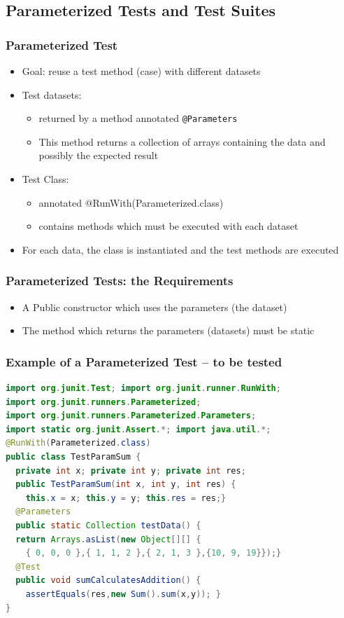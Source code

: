 \documentclass{beamer}
\begin{document}
\subsection{Parameterized Tests and Test Suites}
\begin{frame}
\frametitle{Parameterized Test}
\begin{itemize}
  \item Goal: reuse a test method (case) with different datasets
  \item Test datasets:
\begin{itemize}
\item returned by a method annotated \texttt{@Parameters}
\item This method returns a collection of arrays containing the data
  and possibly the expected result
\end{itemize}
  \item Test Class:
\begin{itemize}
  \item annotated @RunWith(Parameterized.class)
  \item contains methods which must be executed with each dataset
\end{itemize}
\item For each data, the class is instantiated and the test methods
  are executed
\end{itemize}
\end{frame}
\begin{frame}
\frametitle{Parameterized Tests: the Requirements}
\begin{itemize}
\item A Public constructor which uses the parameters (the dataset)
  
  \item The method which returns the parameters (datasets) must be static
\end{itemize}
\end{frame}
\begin{frame}[fragile]
\frametitle{Example of a Parameterized Test -- to be tested}
\begin{tiny}\begin{lstlisting}[language=JAVA]
import org.junit.Test; import org.junit.runner.RunWith;
import org.junit.runners.Parameterized;
import org.junit.runners.Parameterized.Parameters;
import static org.junit.Assert.*; import java.util.*;
@RunWith(Parameterized.class)
public class TestParamSum {
  private int x; private int y; private int res;
  public TestParamSum(int x, int y, int res) {
    this.x = x; this.y = y; this.res = res;}
  @Parameters
  public static Collection testData() {
  return Arrays.asList(new Object[][] {
    { 0, 0, 0 },{ 1, 1, 2 },{ 2, 1, 3 },{10, 9, 19}});}
  @Test
  public void sumCalculatesAddition() {
    assertEquals(res,new Sum().sum(x,y)); }
}
\end{lstlisting}
\end{tiny}
\end{frame}
\end{document}
